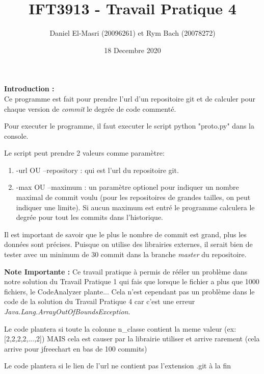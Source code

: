 \documentclass[11pt]{article}
\title{IFT3913 - Travail Pratique 4}
\author{Daniel El-Masri (20096261) et Rym Bach (20078272)}
\date{18 Decembre 2020}
\begin{document}
	
\maketitle

\textbf{Introduction :}\\

Ce programme est fait pour prendre l'url d'un repositoire git et de calculer pour chaque version de \textit{commit} le degr\'ee de code comment\'e. 

Pour executer le programme, il faut executer le script python "proto.py" dans la console. 

Le script peut prendre 2 valeurs comme param\`etre:

\begin{enumerate}
	\item -url OU --repository : qui est l'url du repositoire git.
	\item -max OU --maximum : un param\`etre optionel pour indiquer un nombre maximal de commit voulu (pour les repositoires de grandes tailles, on peut indiquer une limite). Si aucun maximum est entr\'e le programme calculera le degr\'ee pour tout les commits dans l'historique.
\end{enumerate}

Il est important de savoir que le plus le nombre de commit est grand, plus les donn\'ees sont pr\'ecises. Puisque on utilise des librairies externes, il serait bien de tester avec un minimum de 30 commit dans la branche \textit{master} du repositoire.


\textbf{Note Importante : } Ce travail pratique \`a permis de r\'e\'eler un probl\`eme dans notre solution du Travail Pratique 1 qui fais que lorsque le fichier a plus que 1000 fichiers, le CodeAnalyzer plante... Cela n'est cependant pas un probl\`eme dans le code de la solution du Travail Pratique 4 car c'est une erreur \textit{Java.Lang.ArrayOutOfBoundsException}. \\

\begin{center}
	\color{red}
	Le code plantera si toute la colonne n\_classe contient la meme valeur (ex: [2,2,2,2,...,2]) MAIS cela est causer par la librairie utiliser et arrive rarement (cela arrive pour jfreechart en bas de 100 commits)
\end{center}

\begin{center}
	\color{red}
	Le code plantera si le lien de l'url ne contient pas l'extension .git \`a la fin
\end{center}
\end{document}
